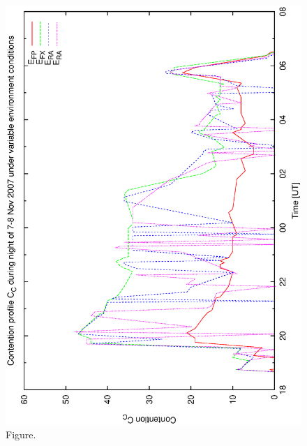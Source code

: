 \documentclass[12pt,a4paper]{article}
\begin{document}
\begin{figure}[htbp]
 \begin{center}
  \includegraphics[scale=1.0, angle=0]{figures/bsb_combine_cont.eps}
 \end{center}
  \caption[Figure.]
{Figure.}
\end{figure}
\clearpage
\end{document}

